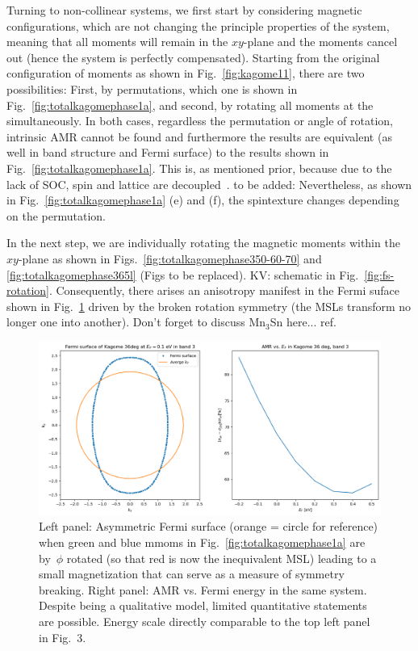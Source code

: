 \documentclass[prb,showpacs,amsmath,amssymb,superscriptaddress,twocolumn,floatfix]{revtex4-1}
\begin{document}
Turning to non-collinear systems, we
first start by considering magnetic configurations, which are not
changing the principle properties of the system, meaning that all
moments will remain in the $xy$-plane and the moments cancel out
(hence the system is perfectly compensated). Starting from the
original configuration of moments as shown in Fig.~\ref{fig:kagome11},
there are two possibilities: First, by permutations, which one is
shown in Fig.~\ref{fig:totalkagomephase1a}, and second, by rotating
all moments at the simultaneously. In both cases, regardless the
permutation or angle of rotation, intrinsic AMR cannot be found and
furthermore the results are equivalent (as well in band structure and
Fermi surface) to the results shown in
Fig.~\ref{fig:totalkagomephase1a}. This is, as mentioned prior,
because due to the lack of SOC, spin and lattice are
decoupled~\cite{Gonzalez-Hernandez:2024}. {\color{red} to be added:}
Nevertheless, as shown in Fig.~\ref{fig:totalkagomephase1a} (e) and (f), the spintexture changes depending on the permutation. 

In the next step, we are individually rotating the magnetic moments
within the $xy$-plane as shown in Figs.~\ref{fig:totalkagomephase350-60-70} and
\ref{fig:totalkagomephase365l} {\color{red} (Figs to be replaced)}.
KV: schematic in Fig.~\ref{fig:fs-rotation}.
Consequently, there arises an anisotropy manifest in the Fermi suface
shown in Fig.~\ref{fig:asymmFS} driven by the broken rotation symmetry (the MSLs
transform no longer one into another). {\color{red} Don't forget to
  discuss Mn$_3$Sn here...} ref.~\cite{Sharma:2023}

\begin{figure}
	\centering
	\includegraphics[width=0.9\linewidth]{img/fig4}
	\caption{Left panel: Asymmetric Fermi surface (orange = circle for reference) when green and blue mmoms in Fig.~\ref{fig:totalkagomephase1a} are by~$\phi$ rotated (so that red is now the inequivalent MSL) leading to a small magnetization that can serve as a measure of symmetry breaking. Right panel: AMR vs. Fermi energy in the same system. Despite being a qualitative model, limited quantitative statements are possible.
      Energy scale directly comparable to the top left panel in Fig.~3.}
   \label{fig:asymmFS}
\end{figure}
\end{document}
